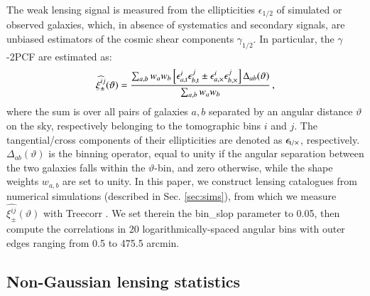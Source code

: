 \documentclass[useAMS,usenatbib]{mn2e}
\begin{document}
The  weak lensing signal is  measured from the ellipticities $\epsilon_{1/2}$ of simulated or observed galaxies, which, in absence of systematics and secondary signals, are unbiased estimators  of the cosmic shear components $\gamma_{1/2}$. In particular, the $\gamma$-2PCF are estimated as:
 \begin{eqnarray}
 \widehat{\xi_{\pm}^{ij}}(\vartheta) = \frac{\sum_{a,b} w_a w_b \left[\epsilon_{a, \rm t}^i\epsilon_{b, \rm t}^j     \pm \epsilon_{a, \times}^i\epsilon_{b, \times}^j    \right]\Delta_{ab}(\vartheta)}{\sum_{a,b} w_a w_b} \, ,
 \label{eq:2PCF_estimator}
  \end{eqnarray}
where the sum is over all pairs of galaxies $a,b$ separated by an angular distance $\vartheta$ on the sky, respectively belonging to the tomographic bins $i$ and $j$. The tangential/cross components of their ellipticities are denoted as $\epsilon_{\rm t/\times}$, respectively. 
$\Delta_{ab}(\vartheta)$ is the binning operator, equal to unity if the angular separation between the two galaxies falls within the $\vartheta$-bin, and zero otherwise, while the shape weights $w_{a,b}$ are set to unity. In this paper, we construct lensing catalogues from numerical simulations (described in Sec. \ref{sec:sims}), from which we measure $ \widehat{\xi_{\pm}^{ij}}(\vartheta)$ with {\sc Treecorr} \citep{TreeCorr}. We set therein the {\sc bin\_slop} parameter to 0.05, then compute the correlations in 20 logarithmically-spaced angular bins with outer edges ranging from 0.5 to 475.5 arcmin. 
 
 
\subsection{Non-Gaussian lensing statistics}
\label{subsec:beyond-2pt}
\end{document}
